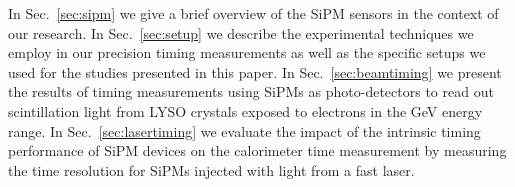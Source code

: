In Sec.~\ref{sec:sipm} we give a brief overview of the SiPM sensors in the
context of our research. In Sec.~\ref{sec:setup} we describe the experimental
techniques we employ in our precision timing measurements as well as the
specific setups we used for the studies presented in this paper. 
In Sec.~\ref{sec:beamtiming} we present the results of timing measurements using 
SiPMs as photo-detectors to read out scintillation light from LYSO crystals exposed 
to electrons in the GeV energy range. In Sec.~\ref{sec:lasertiming} we evaluate the
impact of the intrinsic timing performance of SiPM devices on the calorimeter 
time measurement by measuring the time resolution for SiPMs injected with
light from a fast laser.
